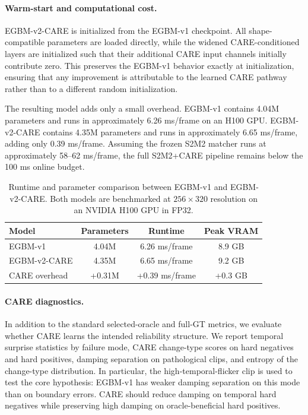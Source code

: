\documentclass[11pt,a4paper]{article}
\begin{document}
\paragraph{Warm-start and computational cost.}
EGBM-v2-CARE is initialized from the EGBM-v1 checkpoint. All shape-compatible
parameters are loaded directly, while the widened CARE-conditioned layers are
initialized such that their additional CARE input channels initially contribute
zero. This preserves the EGBM-v1 behavior exactly at initialization, ensuring
that any improvement is attributable to the learned CARE pathway rather than to a
different random initialization.

The resulting model adds only a small overhead. EGBM-v1 contains 4.04M
parameters and runs in approximately 6.26 ms/frame on an H100 GPU. EGBM-v2-CARE
contains 4.35M parameters and runs in approximately 6.65 ms/frame, adding only
0.39 ms/frame. Assuming the frozen S2M2 matcher runs at approximately
58--62 ms/frame, the full S2M2+CARE pipeline remains below the 100 ms online
budget.

\begin{table}[t]
\centering
\caption{Runtime and parameter comparison between EGBM-v1 and EGBM-v2-CARE.
Both models are benchmarked at $256\times320$ resolution on an NVIDIA H100 GPU
in FP32.}
\label{tab:care_runtime}
\begin{tabular}{lccc}
\toprule
Model & Parameters & Runtime & Peak VRAM \\
\midrule
EGBM-v1 & 4.04M & 6.26 ms/frame & 8.9 GB \\
EGBM-v2-CARE & 4.35M & 6.65 ms/frame & 9.2 GB \\
\midrule
CARE overhead & +0.31M & +0.39 ms/frame & +0.3 GB \\
\bottomrule
\end{tabular}
\end{table}

\paragraph{CARE diagnostics.}
In addition to the standard selected-oracle and full-GT metrics, we evaluate
whether CARE learns the intended reliability structure. We report temporal
surprise statistics by failure mode, CARE change-type scores on hard negatives
and hard positives, damping separation on pathological clips, and entropy of the
change-type distribution. In particular, the high-temporal-flicker clip is used
to test the core hypothesis: EGBM-v1 has weaker damping separation on this mode
than on boundary errors. CARE should reduce damping on temporal hard negatives
while preserving high damping on oracle-beneficial hard positives.
\end{document}
